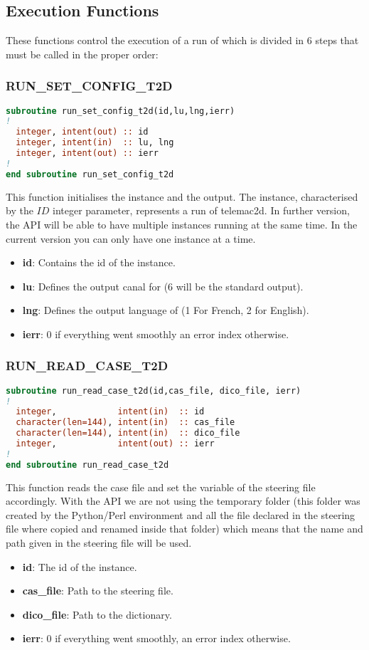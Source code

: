 \subsection{Execution Functions}
%
These functions control the execution of a run of  which is divided in 6
steps that must be called in the proper order:
%
\subsubsection{RUN\_SET\_CONFIG\_T2D}
%
\begin{lstlisting}[language=Fortran]
subroutine run_set_config_t2d(id,lu,lng,ierr)    
!
  integer, intent(out) :: id
  integer, intent(in)  :: lu, lng
  integer, intent(out) :: ierr
!
end subroutine run_set_config_t2d
\end{lstlisting}
This function initialises the instance and the output. The instance,
characterised by the $ID$ integer parameter, represents a run of telemac2d. In
further version, the API will be able to have multiple instances running at
the same time. In the current version you can only have one instance at a time.
\begin{itemize}
\item \textbf{id}: Contains the id of the instance.
\item \textbf{lu}: Defines the output canal for  (6 will be the standard
output).
\item \textbf{lng}: Defines the output language of  (1 For French, 2 for
English).
\item \textbf{ierr}: 0 if everything went smoothly an error index otherwise.
\end{itemize}
%
\subsubsection{RUN\_READ\_CASE\_T2D}
%
\begin{lstlisting}[language=Fortran]
subroutine run_read_case_t2d(id,cas_file, dico_file, ierr)
!
  integer,            intent(in)  :: id
  character(len=144), intent(in)  :: cas_file
  character(len=144), intent(in)  :: dico_file
  integer,            intent(out) :: ierr
!
end subroutine run_read_case_t2d
\end{lstlisting}
This function reads the case file and set the variable of the  steering
file accordingly. With the API we are not using the temporary folder (this
folder was created by the Python/Perl environment and all the file declared in
the steering file where copied and renamed inside that folder) which means that
the name and path given in the steering file will be used.
\begin{itemize}
\item \textbf{id}: The id of the instance.
\item \textbf{cas\_file}: Path to the steering file.
\item \textbf{dico\_file}: Path to the  dictionary.
\item \textbf{ierr}: 0 if everything went smoothly, an error index otherwise.
\end{itemize}
%
